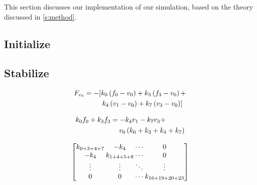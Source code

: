 This section discusses our implementation of our simulation, based on the theory discussed in \cref{s:method}. 

\subsection{Initialize}

\subsection{Stabilize}

\begin{equation}\label{eq:implementation:forceOnVo}
	\begin{split}
	F_{v_{0}} 	& = - [				k_{0} \left(f_{0} - v_{0}\right) +
												k_{3} \left(f_{3} - v_{0}\right) + \\
							& \quad\quad\;\;	k_{4} \left(v_{1} - v_{0}\right)  +
												k_{7} \left(v_{3} - v_{0}\right) ]
	\end{split}
\end{equation}


\begin{equation}\label{eq:implementation:forceOnVoVersimpled}
	\begin{split}
	k_{0}f_{0} + k_{3}f_{3} 
		&= - k_{4}v_{1} - k_{7}v_{3} + \\
		& \quad\: v_{0} \left( k_{0} + k_{3} + k_{4} + k_{7} \right)
	\end{split}
\end{equation}

\begin{equation}\label{eq:implementation:rhs}
{
	\arraycolsep=1pt
	\begin{bmatrix}
		\spring{0 + 3 + 4 + 7}	& -\spring{4}			& \cdots & 0\\
		- \spring{4} 			& \spring{1 + 4+ 5 + 8}	& \cdots & 0\\
		\vdots					& \vdots 				& \ddots & \vdots\\
		0						& 0 					& \cdots & \spring{16 + 19 + 20 + 23}\\
	\end{bmatrix}
}
\end{equation}

